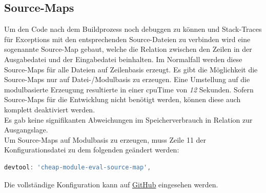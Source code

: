 \documentclass[11pt]{report}
\begin{document}
    		\subsection{Source-Maps}
    			Um den Code nach dem Buildprozess noch debuggen zu können und Stack-Traces für Exceptions mit den entsprechenden Source-Dateien zu verbinden wird eine sogenannte Source-Map gebaut, welche die Relation zwischen den Zeilen in der Ausgabedatei und der Eingabedatei beinhalten. Im Normalfall werden diese Source-Maps für alle Dateien auf Zeilenbasis erzeugt. Es gibt die Möglichkeit die Source-Maps nur auf Datei-/Modulbasis zu erzeugen. Eine Umstellung auf die modulbasierte Erzeugung resultierte in einer \Gls{cpuTime} von \emph{12} Sekunden. Sofern Source-Maps für die Entwicklung nicht benötigt werden, können diese auch komplett deaktiviert werden.\\
    			Es gab keine signifikanten Abweichungen im Speicherverbrauch in Relation zur Ausgangslage.\\
    			Um Source-Maps auf Modulbasis zu erzeugen, muss Zeile 11 der Konfigurationsdatei zu dem folgenden geändert werden:
    			\begin{center}
		        	\lstset{%
					    caption=Caching,
						basicstyle=\footnotesize,
						xleftmargin=.15\textwidth,
						xrightmargin=.15\textwidth,
						numbers=none
					}
		        	\begin{lstlisting}[language=JavaScript]
		        		devtool: 'cheap-module-eval-source-map',
		        	\end{lstlisting}
	        	\end{center}  
    			Die vollständige Konfiguration kann auf \href{https://github.com/TexNAK/WebBundlerOptimization/compare/master...destr_cheapSourceMaps#diff-1fb5683b1e7adbcee273b7f9f9a08a22}{GitHub} eingesehen werden.

\end{document}
